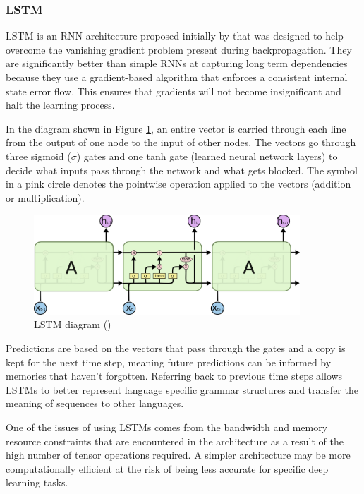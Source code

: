 \subsubsection{\acrlong{LSTM}}

\acrfull{LSTM} is an \acrshort{RNN} architecture proposed initially by \cite{hochreiter_long_1997} that was designed to help overcome the vanishing gradient problem present during backpropagation. They are significantly better than simple \acrshort{RNN}s at capturing long term dependencies because they use a gradient-based algorithm that enforces a consistent internal state error flow. This ensures that gradients will not become insignificant and halt the learning process.

In the diagram shown in Figure \ref{fig:rnn_lstm}, an entire vector is carried through each line from the output of one node to the input of other nodes. The vectors go through three sigmoid ($\sigma$) gates and one tanh gate (learned neural network layers) to decide what inputs pass through the network and what gets blocked. The symbol in a pink circle denotes the pointwise operation applied to the vectors (addition or multiplication).

\begin{figure}[ht!]
\centering
\includegraphics[width=0.89\textwidth]{media/literature/machine_learning/ml_rnn_lstm.png}
\caption[Diagram of Long Short Term Memory]{\acrfull{LSTM} diagram (\cite{colah_lstm_2019})}
\label{fig:rnn_lstm}
\end{figure}

Predictions are based on the vectors that pass through the gates and a copy is kept for the next time step, meaning future predictions can be informed by memories that haven't forgotten. Referring back to previous time steps allows \acrshort{LSTM}s to better represent language specific grammar structures and transfer the meaning of sequences to other languages.


One of the issues of using \acrshort{LSTM}s comes from the bandwidth and memory resource constraints that are encountered in the architecture as a result of the high number of tensor operations required. A simpler architecture may be more computationally efficient at the risk of being less accurate for specific deep learning tasks.

